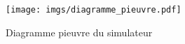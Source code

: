         \begin{figure}[!htb]
            \centering
                
            \texttt{[image: imgs/diagramme\_pieuvre.pdf]}
            \caption{Diagramme pieuvre du simulateur}
            \label{figure:pieuvre}
        \end{figure}

